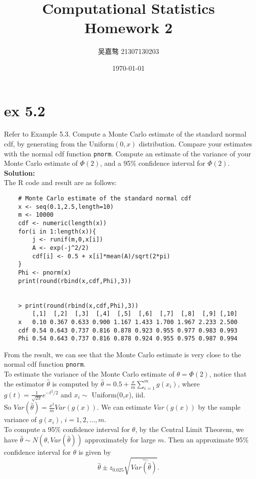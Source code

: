 \documentclass[UTF8]{ctexart}
\title{\textbf{Computational Statistics Homework 2}}
\author{吴嘉骜 21307130203}
\date{\today}
\begin{document}
\maketitle

\noindent
\section{ex 5.2}
\setlength{\parindent}{0pt}
Refer to Example 5.3.
Compute a Monte Carlo estimate of the standard
normal cdf, by generating from the Uniform$(0,x)$ distribution. Compare your
estimates with the normal cdf function \texttt{pnorm}. Compute an estimate of the
variance of your Monte Carlo estimate of $\Phi(2)$, and a 95\% confidence interval
for $\Phi(2)$.\\
\textbf{Solution:}\\
The R code and result are as follows:
\begin{lstlisting}
    # Monte Carlo estimate of the standard normal cdf
    x <- seq(0.1,2.5,length=10)
    m <- 10000
    cdf <- numeric(length(x))
    for(i in 1:length(x)){
        j <- runif(m,0,x[i])
        A <- exp(-j^2/2)
        cdf[i] <- 0.5 + x[i]*mean(A)/sqrt(2*pi)
    }
    Phi <- pnorm(x)
    print(round(rbind(x,cdf,Phi),3))


    > print(round(rbind(x,cdf,Phi),3))
        [,1]  [,2]  [,3]  [,4]  [,5]  [,6]  [,7]  [,8]  [,9] [,10]
    x   0.10 0.367 0.633 0.900 1.167 1.433 1.700 1.967 2.233 2.500
    cdf 0.54 0.643 0.737 0.816 0.878 0.923 0.955 0.977 0.983 0.993
    Phi 0.54 0.643 0.737 0.816 0.878 0.924 0.955 0.975 0.987 0.994
\end{lstlisting}
From the result, we can see that the Monte Carlo estimate is very close to the normal cdf function \texttt{pnorm}.\\
To estimate the variance of the Monte Carlo estimate of $\theta = \Phi(2)$, notice that the estimator $\hat{\theta}$ is computed by 
$\hat{\theta} = 0.5 + \frac{x}{m}\sum\limits_{i=1}^{m}g(x_i)$, where $g(t) = \frac{1}{\sqrt{2\pi}}e^{-t^2/2}$ and $x_i \sim$ Uniform(0,$x$), iid.\\
So $Var(\hat{\theta}) = \frac{x^2}{m} Var(g(x))$. We can estimate $Var(g(x))$ by the sample variance of $g(x_i)$, $i = 1,2,\ldots,m$.\\
To compute a 95\% confidence interval for $\theta$, by the Central Limit Theorem,
we have $\hat{\theta} \sim N(\theta, Var(\hat{\theta}))$ approximately for large $m$. Then an approximate 95\% confidence interval for $\theta$ is given by
\begin{equation*}
    \hat{\theta} \pm z_{0.025}\sqrt{\widehat{Var(\hat{\theta})}}.
\end{equation*}
\end{document}
